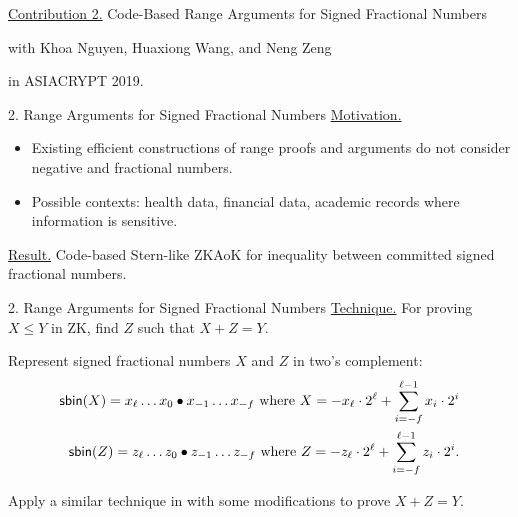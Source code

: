 \begin{frame}
	\underline{Contribution 2.} Code-Based Range Arguments for Signed Fractional Numbers
	
	{\small with Khoa Nguyen, Huaxiong Wang, and Neng Zeng}
	
	in ASIACRYPT 2019.
\end{frame}

\begin{frame}{2. Range Arguments for Signed Fractional Numbers}
	\underline{Motivation.} 
	\begin{itemize}
		\item Existing efficient constructions of range proofs and arguments do not consider negative and fractional numbers.
		\item Possible contexts: health data, financial data, academic records where information is sensitive.
	\end{itemize}

	\underline{Result.} Code-based Stern-like ZKAoK for inequality between committed signed fractional numbers.
	
\end{frame}

\begin{frame}{2. Range Arguments for Signed Fractional Numbers}
	\underline{Technique.} For proving $X \leq Y$ in ZK, find $Z$ such that $X + Z = Y$.
	
	Represent signed fractional numbers $X$ and $Z$ in two's complement:
	\begin{align*}
		\mathsf{sbin}(X) = x_\ell \dots x_0\bullet x_{-1}\dots x_{-f} \text{ where } X = -x_\ell \cdot 2^{\ell} + \sum_{i = -f}^{\ell-1} x_i\cdot 2^i\\ 
		\mathsf{sbin}(Z) = z_\ell \dots z_0\bullet z_{-1}\dots z_{-f} \text{ where } Z = -z_\ell \cdot 2^{\ell} + \sum_{i = -f}^{\ell-1} z_i\cdot 2^i.
	\end{align*}

	Apply a similar technique in \cite{LibertLNW18} with some modifications to prove $X + Z = Y$.
\end{frame}